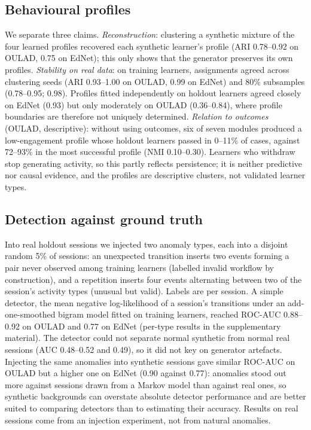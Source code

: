 \documentclass[preprint,12pt]{elsarticle}
\begin{document}
\subsection{Behavioural profiles}
We separate three claims. \emph{Reconstruction}: clustering a synthetic
mixture of the four learned profiles recovered each synthetic learner's
profile (ARI 0.78--0.92 on OULAD, 0.75 on EdNet); this only shows that the
generator preserves its own profiles. \emph{Stability on real data}: on
training learners, assignments agreed across clustering seeds (ARI
0.93--1.00 on OULAD, 0.99 on EdNet) and 80\% subsamples (0.78--0.95; 0.98).
Profiles fitted independently on holdout learners agreed closely on EdNet
(0.93) but only moderately on OULAD (0.36--0.84), where profile boundaries
are therefore not uniquely determined. \emph{Relation to outcomes}
(OULAD, descriptive): without using outcomes, six of seven modules produced a
low-engagement profile whose holdout learners passed in 0--11\% of cases,
against 72--93\% in the most successful profile (NMI 0.10--0.30). Learners
who withdraw stop generating activity, so this partly reflects persistence;
it is neither predictive nor causal evidence, and the profiles are
descriptive clusters, not validated learner types.

\subsection{Detection against ground truth}
Into real holdout sessions we injected two anomaly types, each into a
disjoint random 5\% of sessions: an unexpected transition inserts two events
forming a pair never observed among training learners (labelled invalid
workflow by construction), and a repetition inserts four events alternating
between two of the session's activity types (unusual but valid). Labels are
per session. A simple detector, the mean negative log-likelihood of a
session's transitions under an add-one-smoothed bigram model fitted on
training learners, reached ROC-AUC 0.88--0.92 on OULAD and 0.77 on EdNet
(per-type results in the supplementary material). The detector could not
separate normal synthetic from normal real sessions (AUC 0.48--0.52 and
0.49), so it did not key on generator artefacts. Injecting the same anomalies
into synthetic sessions gave similar ROC-AUC on OULAD but a higher one on
EdNet (0.90 against 0.77): anomalies stood out more against sessions drawn
from a Markov model than against real ones, so synthetic backgrounds can
overstate absolute detector performance and are better suited to comparing
detectors than to estimating their accuracy. Results on real sessions come
from an injection experiment, not from natural anomalies.
\end{document}
